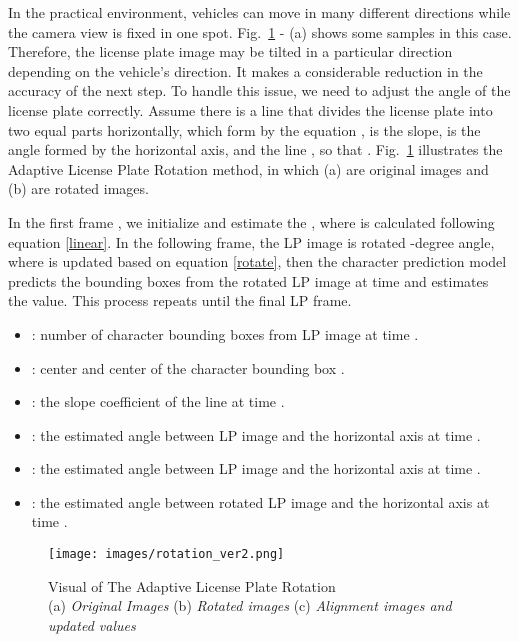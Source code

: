 \documentclass[conference]{IEEEtran}
\begin{document}
In the practical environment, vehicles can move in many different directions while the camera view is fixed in one spot. Fig.~\ref{rotation} - (a) shows some samples in this case. Therefore, the license plate image may be tilted in a particular direction depending on the vehicle's direction. It makes a considerable reduction in the accuracy of the next step. To handle this issue, we need to adjust the angle of the license plate correctly. Assume there is a line  that divides the license plate into two equal parts horizontally, which form by the equation ,  is the slope,  is the angle formed by the horizontal axis, and the line , so that . Fig.~\ref{rotation} illustrates the Adaptive License Plate Rotation method, in which (a) are original images and (b) are rotated images. 

In the first frame , we initialize  and estimate the , where  is calculated following equation \eqref{linear}. In the following frame, the LP image is rotated -degree angle, where  is updated based on equation \eqref{rotate}, then the character prediction model predicts the bounding boxes from the rotated LP image at time  and estimates the  value. This process repeats until the final LP frame. 


\begin{itemize}[where:]
    \item : number of character bounding boxes from LP image at time .
    \item :  center and  center of the character bounding box .
    \item : the slope coefficient of the line  at time .
\end{itemize}



\begin{itemize}[where:]
    \item : the estimated angle between LP image and the horizontal axis at time .
    \item : the estimated angle between LP image and the horizontal axis at time .
    \item : the estimated angle between rotated LP image and the horizontal axis at time .
\end{itemize}

\begin{figure}[htp]
  \centering
    \texttt{[image: images/rotation\_ver2.png]}
  \caption{Visual of The Adaptive License Plate Rotation \\
    (a) \emph{Original Images} (b) \emph{Rotated images} (c) \emph{Alignment images and updated values} 
  }
  \label{rotation}
\end{figure}
\end{document}
